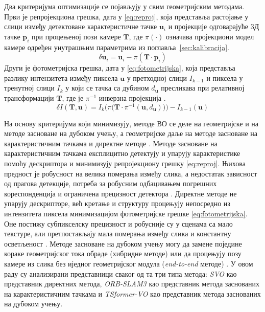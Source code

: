 \documentclass[12pt]{article}
\begin{document}
Два критеријума оптимизације се појављују у свим геометријским методама. Први
је репројекциона грешка, дата у \eqref{eq:reproj}, која представља растојање у
слици између детектоване карактеристичне тачке $\mathbf{u}_i$ и пројекције
одговарајуће 3Д тачке $\mathbf{p}_i$ при процењеној пози камере $\mathbf{T}$,
где $\pi(\cdot)$ означава пројекциони модел камере одређен унутрашњим
параметрима из поглавља~\ref{sec:kalibracija}.
\begin{equation}
	\delta \mathbf{u}_i = \mathbf{u}_i - \pi\left(\mathbf{T} \cdot \mathbf{p}_i\right)
	\label{eq:reproj}
\end{equation}
Други је фотометријска грешка, дата у \eqref{eq:fotometrijska}, која представља
разлику интензитета између пиксела $\mathbf{u}$ у претходној слици $I_{k-1}$ и
пиксела у тренутној слици $I_k$ у који се тачка са дубином $d_{\mathbf{u}}$
пресликава при релативној трансформацији $\mathbf{T}$, где је $\pi^{-1}$
инверзна пројекција \cite{forster2014svo}.
\begin{equation}
	\delta I\left(\mathbf{T}, \mathbf{u}\right)
	= I_k\Big(\pi\big(\mathbf{T} \cdot \pi^{-1}(\mathbf{u}, d_{\mathbf{u}})\big)\Big) - I_{k-1}(\mathbf{u})
	\label{eq:fotometrijska}
\end{equation}

На основу критеријума који минимизују, методе ВО се деле на геометријске и на
методе засноване на дубоком учењу, а геометријске даље на методе засноване на
карактеристичним тачкама и директне методе \cite{duan2019dlvslam}. Методе
засноване на карактеристичним тачкама експлицитно детектују и упарују
карактеристике помоћу дескриптора и минимизују репројекциону грешку
\eqref{eq:reproj}. Њихова предност је робусност на велика померања између
слика, а недостатак зависност од прагова детекције, потреба за робусним
одбацивањем погрешних кореспонденција и ограничена прецизност детектора
\cite{forster2014svo}. Директне методе не упарују дескрипторе, већ кретање и
структуру процењују непосредно из интензитета пиксела минимизацијом
фотометријске грешке \eqref{eq:fotometrijska}. Оне постижу субпикселску
прецизност и робусније су у сценама са мало текстуре, али претпостављају мала
померања између слика и константну осветљеност \cite{engel2017direct}. Методе
засноване на дубоком учењу могу да замене поједине кораке геометријског тока
обраде (хибридне методе) или да процењују позу камере из слика без иједног
геометријског модула (\textit{end-to-end} методе) \cite{Francani2025}. У овом
раду су анализирани представници сваког од та три типа метода:
\textit{SVO} као представник директних метода, \textit{ORB-SLAM3} као
представник метода заснованих на карактеристичним тачкама и
\textit{TSformer-VO} као представник метода заснованих на дубоком учењу.
\end{document}
